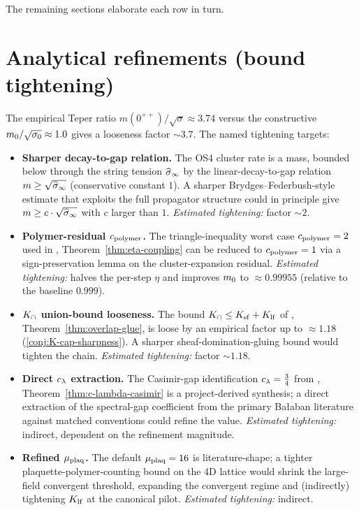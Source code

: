 The remaining sections elaborate each row in turn.

\section{Analytical refinements (bound tightening)}
\label{sec:roadmap-tightening}

%

The empirical Teper ratio
$m(0^{++}) / \sqrt{\sigma} \approx 3.74$
\cite{Teper1998Glueballs,LuciniTeperWenger2004} versus the
constructive $m_0 / \sqrt{\sigma_0} \approx 1.0$ gives a
looseness factor $\sim 3.7$.  The named tightening targets:

\begin{itemize}
  \item \textbf{Sharper decay-to-gap relation.}  The OS4 cluster
    rate is a mass, bounded below through the string tension
    $\widehat{\sigma}_\infty$ by the linear-decay-to-gap relation
    $m \ge \sqrt{\widehat{\sigma}_\infty}$ (conservative constant $1$).  A
    sharper Brydges--Federbush-style estimate that exploits the
    full propagator structure could in principle give
    $m \ge c \cdot \sqrt{\widehat{\sigma}_\infty}$ with $c$ larger than $1$.
    \emph{Estimated tightening:} factor $\sim 2$.

  \item \textbf{Polymer-residual $c_{\mathrm{polymer}}$.}  The
    triangle-inequality worst case $c_{\mathrm{polymer}} = 2$ used in
    , Theorem~\ref{thm:eta-coupling}
    can be reduced to $c_{\mathrm{polymer}} = 1$ via a sign-preservation
    lemma on the cluster-expansion residual.
    \emph{Estimated tightening:} halves the per-step $\eta$ and
    improves $m_0$ to $\approx 0.99955$ (relative to the
    baseline $0.999$).

  \item \textbf{$K_{\cap}$ union-bound looseness.}  The bound
    $K_{\cap} \le K_{\mathrm{sf}} + K_{\mathrm{lf}}$ of ,
    Theorem~\ref{thm:overlap-glue}, is loose by an empirical
    factor up to $\approx 1.18$ (\cref{conj:K-cap-sharpness}).
    A sharper sheaf-domination-gluing bound would tighten the
    chain.  \emph{Estimated tightening:} factor $\sim 1.18$.

  \item \textbf{Direct $c_\lambda$ extraction.}  The Casimir-gap
    identification $c_\lambda = \tfrac34$ from
    , Theorem~\ref{thm:c-lambda-casimir}
    is a project-derived synthesis; a direct extraction of the
    spectral-gap coefficient from the primary Bałaban literature
    against matched conventions could refine the value.
    \emph{Estimated tightening:} indirect, dependent on the
    refinement magnitude.

  \item \textbf{Refined $\mu_{\mathrm{plaq}}$.}  The default $\mu_{\mathrm{plaq}} = 16$ is
    literature-shape; a tighter plaquette-polymer-counting bound
    on the 4D lattice would shrink the large-field convergent
    threshold, expanding the convergent regime and (indirectly)
    tightening $K_{\mathrm{lf}}$ at the canonical pilot.
    \emph{Estimated tightening:} indirect.
\end{itemize}


